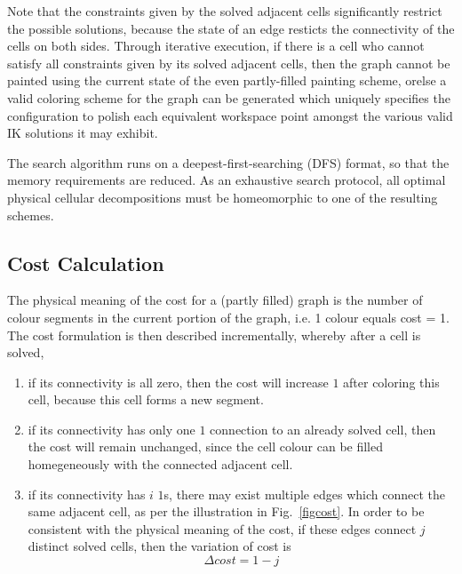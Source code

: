 \documentclass[journal]{IEEEtran}
\begin{document}
Note that the constraints given by the solved adjacent cells significantly restrict the possible solutions, 
because the state of an edge resticts the connectivity of the cells on both sides. 
Through iterative execution, if there is a cell who cannot satisfy all constraints given by its solved adjacent cells, then the graph cannot be painted using the current state of the even partly-filled painting scheme, orelse a valid coloring scheme for the graph can be generated which uniquely specifies the configuration to polish each equivalent workspace point amongst the various valid IK solutions it may exhibit. 

The search algorithm runs on a deepest-first-searching (DFS) format, so that the memory requirements are reduced. 
As an exhaustive search protocol, all optimal physical cellular decompositions must be homeomorphic to one of the resulting schemes.

\subsection{Cost Calculation}
The physical meaning of the cost for a (partly filled) graph is the number of colour segments in the current portion of the graph, 
i.e. 1 colour equals cost = 1.
The cost formulation is then described incrementally, whereby after a cell is solved,  
\begin{enumerate}
\item if its connectivity is all zero, then the cost will increase $1$ after coloring this cell, because this cell forms a new segment.
\item if its connectivity has only one $1$ connection to an already solved cell, then the cost will remain unchanged, since the cell colour can be filled homegeneously with the connected adjacent cell. 
\item if its connectivity has $i$ $1$s, there may exist multiple edges which connect the same adjacent cell, as per the illustration 
in Fig.~\ref{figcost}. In order to be consistent with the physical meaning of the cost, 
if these edges connect $j$ distinct solved cells, then the variation of cost is 
\begin{equation}
\Delta cost = 1-j
\label{eq:cost}
\end{equation}
\end{enumerate}
\end{document}
